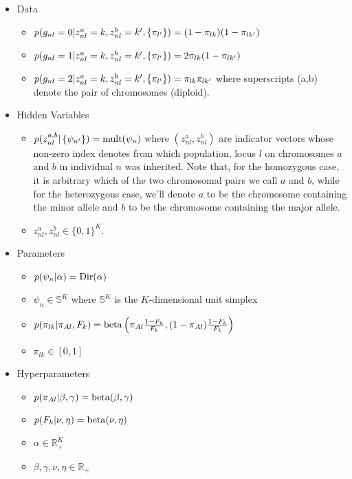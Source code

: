 \documentclass[reqno]{amsart}
\numberwithin{equation}{section}
\begin{document}
\begin{itemize}
    \item Data
    \begin{itemize}
        \item $p(g_{nl}=0 | z^a_{nl}=k, z^b_{nl}=k', \left \{ \pi_{l'} \right \}) = (1-\pi_{lk}) (1-\pi_{lk'})$
        \item $p(g_{nl}=1 | z^a_{nl}=k, z^b_{nl}=k', \left \{ \pi_{l'} \right \}) = 2\pi_{lk}(1-\pi_{lk'})$
        \item $p(g_{nl}=2 | z^a_{nl}=k, z^b_{nl}=k', \left \{ \pi_{l'} \right \}) = \pi_{lk}\pi_{lk'}$
        where superscripts (a,b) denote the pair of chromosomes (diploid).
    \end{itemize}
    \item Hidden Variables
    \begin{itemize}
        \item $p(z^{a,b}_{nl} | \left \{ \psi_{n'} \right \}) = \mathrm{mult}(\psi_n)$ where $(z^a_{nl},z^b_{nl})$ are indicator vectors 
        whose non-zero index denotes from which population, locus $l$ on chromosomes $a$ and $b$ in individual $n$ was inherited.
        Note that, for the homozygous case, it is arbitrary which of the two chromosomal pairs we call $a$ and $b$, while for the
        heterozygous case, we'll denote $a$ to be the chromosome containing the minor allele and $b$ to be the chromosome containing
        the major allele.
        \item $z^a_{nl},z^b_{nl} \in \{0,1\}^K$.
    \end{itemize}
    \item Parameters
    \begin{itemize}
        \item $p(\psi_n | \alpha) = \mathrm{Dir}(\alpha)$
        \item $\psi_n \in \mathbb{S}^K$ where $\mathbb{S}^K$ is the $K$-dimensional unit simplex
        \item $p(\pi_{lk} | \pi_{Al}, F_k) = \mathrm{beta} \left(\pi_{Al} \frac{1-F_k}{F_k}, (1-\pi_{Al}) \frac{1-F_k}{F_k} \right)$
        \item $\pi_{lk} \in [0,1]$
    \end{itemize}
    \item Hyperparameters
    \begin{itemize}
        \item $p(\pi_{Al} | \beta, \gamma) = \mathrm{beta}(\beta, \gamma)$
        \item $p(F_k | \nu, \eta) = \mathrm{beta}(\nu, \eta)$
        \item $\alpha \in \mathbb{R}_+^K$
        \item $\beta, \gamma, \nu, \eta \in \mathbb{R}_+$
    \end{itemize}
\end{itemize}
\end{document}
